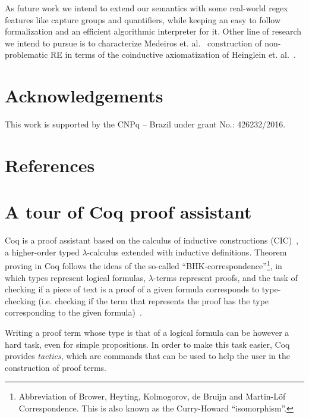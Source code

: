 \documentclass[review]{elsarticle}
\theoremstyle{definition}
\begin{document}
As future work we intend to extend our semantics with some real-world regex
features like capture groups and quantifiers, while keeping an easy to follow
formalization and an efficient algorithmic interpreter for it. Other line of
research we intend to pursue is to characterize Medeiros et.
al.~\cite{Medeiros14} construction of non-problematic RE in terms of the 
coinductive axiomatization of Heinglein et. al.~\cite{Henglein2011}.


\section*{Acknowledgements}

This work is supported by the CNPq – Brazil under grant No.: 426232/2016.

\section*{References}



\appendix

\section{A tour of Coq proof assistant}\label{section:coq}

Coq is a proof assistant based on the calculus of inductive
constructions (CIC)~\cite{Bertot2010}, a higher-order typed
$\lambda$-calculus extended with inductive definitions. Theorem
proving in Coq follows the ideas of the so-called
``BHK-correspondence''\footnote{Abbreviation of Brower, Heyting,
  Kolmogorov, de Bruijn and Martin-L\"of Correspondence. This is also
  known as the Curry-Howard ``isomorphism''.}, in which types represent
logical formulas, $\lambda$-terms represent proofs, and the task of
checking if a piece of text is a proof of a given formula corresponds
to type-checking (i.e. checking if the term that represents the proof
has the type corresponding to the given formula)~\cite{Sorensen2006}.

Writing a proof term whose type is that of a logical formula can be
however a hard task, even for simple propositions.  In order to make
this task easier, Coq provides \emph{tactics}, which are commands that
can be used to help the user in the construction of proof terms.
\end{document}
